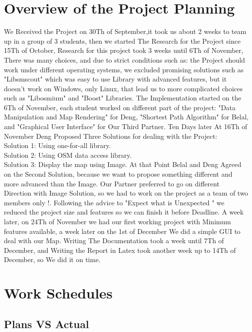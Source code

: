 \documentclass[a4paper,english]{book}
\begin{document}
\section{Overview of the Project Planning}
We Received the Project on 30Th of September,it took us about 2 weeks to team up in a group of 3 students, then we started The Research for the Project since 15Th of October, Research for this project took 3 weeks until 6Th of November, There was many choices, and due to strict conditions such as: the Project should work under different operating systems, we excluded promising solutions such as "Libsmscout" which was easy to use Library with advanced features, but it doesn't work on Windows, only Linux, that lead us to more complicated choices such as "Libosmium" and "Boost" Libraries.
The Implementation started on the 6Th of November, each student worked on different part of the project: "Data Manipulation and Map Rendering" for Deng, "Shortest Path Algorithm" for Belal, and "Graphical User Interface" for Our Third Partner.
Ten Days later At 16Th of November Deng Proposed Three Solutions for dealing with the Project:
\\ \textbf{}Solution 1: Using one-for-all library.
\\ \textbf{}Solution 2: Using OSM data access library.
\\ \textbf{}Solution 3: Display the map using Image.
At that Point Belal and Deng Agreed on the Second Solution, because we want to propose something different and more advanced than the Image.
Our Partner preferred to go on different Direction with Image Solution, so we had to work on the project as a team of two members only !.
Following the advice to "Expect what is Unexpected " we reduced the project size and features so we can finish it before Deadline.
A week later, on 24Th of November we had our first working project with Minimum features available, a week later on the 1st of December We did a simple GUI to deal with our Map.
Writing The Documentation took a week until 7Th of December, and Writing the Report in Latex took another week up to 14Th of December, so We did it on time.

\section{Work Schedules}
\subsection{Plans VS Actual}
\end{document}
